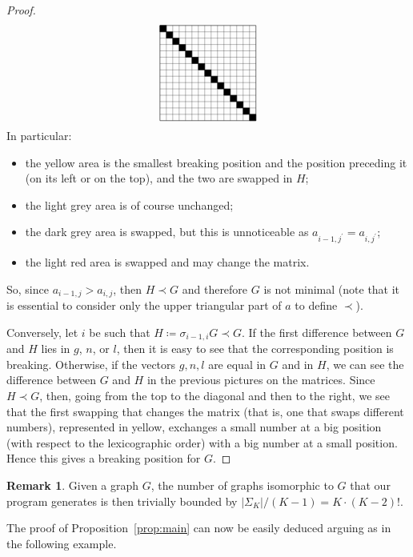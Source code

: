 \documentclass{amsart}
\theoremstyle{plain}
\theoremstyle{definition}
\newtheorem{remark}[theorem]{Remark}
\newcommand{\abs}[1]{\left|#1\right|}
\begin{document}
\begin{proof}
\[\begin{tikzpicture}[xscale=0.2,yscale=-0.2,baseline=-40]
    \draw (0,0) -- (15,0) -- (15,15) -- (0,15) -- cycle;
    \foreach \x in {1,2,...,14}
    {
      \draw [very thin] (0,\x) -- (15,\x);
      \draw [very thin] (\x,0) -- (\x,15);
    }
    \foreach \x in {0,1,...,14}
      \filldraw (\x,\x) -- (\x,\x+1) -- (\x+1,\x+1) -- (\x+1,\x) -- cycle;
  \end{tikzpicture}
  \]
  In particular:
  \begin{itemize}
  \item the yellow area is the smallest breaking position and the
    position preceding it (on its left or on the top), and the two are
    swapped in $H$;
  \item the light grey area is of course unchanged;
  \item the dark grey area is swapped, but this is unnoticeable as
    $a_{i-1,j^\prime} = a_{i,j^\prime}$;
  \item the light red area is swapped and may change the matrix.
  \end{itemize}
  So, since $a_{i-1,j} > a_{i, j}$, then $H \prec G$ and therefore $G$
  is not minimal (note that it is essential to consider only the upper
  triangular part of $a$ to define $\prec$).

  Conversely, let $i$ be such that $H \coloneqq \sigma_{i-1,i} G \prec
  G$. If the first difference between $G$ and $H$ lies in $g$, $n$, or
  $l$, then it is easy to see that the corresponding position is
  breaking. Otherwise, if the vectors $g,n,l$ are equal in $G$ and in $H$, we can see the difference between $G$ and $H$
  in the previous pictures on the matrices. Since $H \prec G$, then, going from the
  top to the diagonal and then to the right, we see that the first
  swapping that changes the matrix (that is, one that swaps different
  numbers), represented in yellow, exchanges a small number at a big
  position (with respect to the lexicographic order) with a big number
  at a small position. Hence this gives a breaking position for $G$.
\end{proof}

\begin{remark}
  Given a graph $G$, the number of graphs isomorphic to $G$ that our
  program generates is then trivially bounded by $\abs{\Sigma_K}/(K-1)
  = K\cdot (K-2)!$.
\end{remark}

The proof of Proposition~\ref{prop:main} can now be easily deduced
arguing as in the following example.
\end{document}
